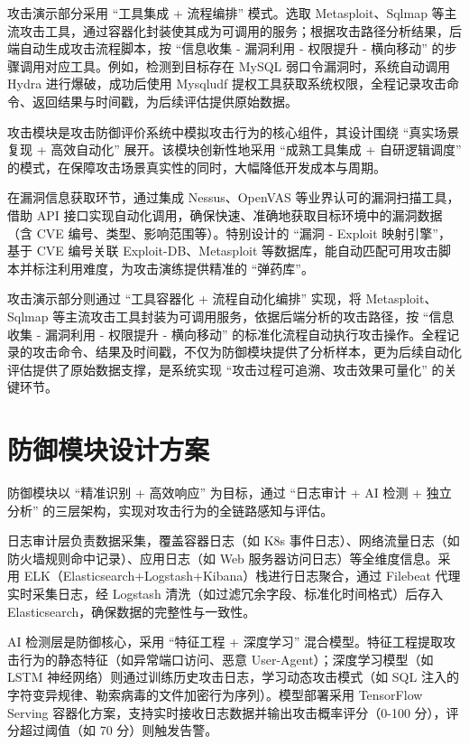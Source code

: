 \documentclass[lang=cn,10pt]{elegantbook}
\begin{document}
攻击演示部分采用 “工具集成 + 流程编排” 模式。选取 Metasploit、Sqlmap 等主流攻击工具，通过容器化封装使其成为可调用的服务；根据攻击路径分析结果，后端自动生成攻击流程脚本，按 “信息收集 - 漏洞利用 - 权限提升 - 横向移动” 的步骤调用对应工具。例如，检测到目标存在 MySQL 弱口令漏洞时，系统自动调用 Hydra 进行爆破，成功后使用 Mysqludf 提权工具获取系统权限，全程记录攻击命令、返回结果与时间戳，为后续评估提供原始数据。
\begin{proposition}
    攻击模块是攻击防御评价系统中模拟攻击行为的核心组件，其设计围绕 “真实场景复现 + 高效自动化” 展开。该模块创新性地采用 “成熟工具集成 + 自研逻辑调度” 的模式，在保障攻击场景真实性的同时，大幅降低开发成本与周期。​
    
在漏洞信息获取环节，通过集成 Nessus、OpenVAS 等业界认可的漏洞扫描工具，借助 API 接口实现自动化调用，确保快速、准确地获取目标环境中的漏洞数据（含 CVE 编号、类型、影响范围等）。特别设计的 “漏洞 - Exploit 映射引擎”，基于 CVE 编号关联 Exploit-DB、Metasploit 等数据库，能自动匹配可用攻击脚本并标注利用难度，为攻击演练提供精准的 “弹药库”。​

攻击演示部分则通过 “工具容器化 + 流程自动化编排” 实现，将 Metasploit、Sqlmap 等主流攻击工具封装为可调用服务，依据后端分析的攻击路径，按 “信息收集 - 漏洞利用 - 权限提升 - 横向移动” 的标准化流程自动执行攻击操作。全程记录的攻击命令、结果及时间戳，不仅为防御模块提供了分析样本，更为后续自动化评估提供了原始数据支撑，是系统实现 “攻击过程可追溯、攻击效果可量化” 的关键环节。
\end{proposition}

\section{防御模块设计方案}
防御模块以 “精准识别 + 高效响应” 为目标，通过 “日志审计 + AI 检测 + 独立分析” 的三层架构，实现对攻击行为的全链路感知与评估。​

日志审计层负责数据采集，覆盖容器日志（如 K8s 事件日志）、网络流量日志（如防火墙规则命中记录）、应用日志（如 Web 服务器访问日志）等全维度信息。采用 ELK（Elasticsearch+Logstash+Kibana）栈进行日志聚合，通过 Filebeat 代理实时采集日志，经 Logstash 清洗（如过滤冗余字段、标准化时间格式）后存入 Elasticsearch，确保数据的完整性与一致性。​

AI 检测层是防御核心，采用 “特征工程 + 深度学习” 混合模型。特征工程提取攻击行为的静态特征（如异常端口访问、恶意 User-Agent）；深度学习模型（如 LSTM 神经网络）则通过训练历史攻击日志，学习动态攻击模式（如 SQL 注入的字符变异规律、勒索病毒的文件加密行为序列）。模型部署采用 TensorFlow Serving 容器化方案，支持实时接收日志数据并输出攻击概率评分（0-100 分），评分超过阈值（如 70 分）则触发告警。​
\end{document}
